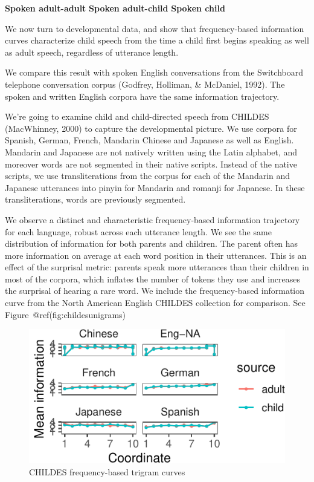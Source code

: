 \documentclass[10pt, letterpaper]{article}
\newenvironment{CodeChunk}{}{}
\begin{document}
\textbf{Spoken adult-adult} \textbf{Spoken adult-child} \textbf{Spoken
child}

We now turn to developmental data, and show that frequency-based
information curves characterize child speech from the time a child first
begins speaking as well as adult speech, regardless of utterance length.

We compare this result with spoken English conversations from the
Switchboard telephone conversation corpus (Godfrey, Holliman, \&
McDaniel, 1992). The spoken and written English corpora have the same
information trajectory.

We're going to examine child and child-directed speech from CHILDES
(MacWhinney, 2000) to capture the developmental picture. We use corpora
for Spanish, German, French, Mandarin Chinese and Japanese as well as
English. Mandarin and Japanese are not natively written using the Latin
alphabet, and moreover words are not segmented in their native scripts.
Instead of the native scripts, we use transliterations from the corpus
for each of the Mandarin and Japanese utterances into pinyin for
Mandarin and romanji for Japanese. In these transliterations, words are
previously segmented.

We observe a distinct and characteristic frequency-based information
trajectory for each language, robust across each utterance length. We
see the same distribution of information for both parents and children.
The parent often has more information on average at each word position
in their utterances. This is an effect of the surprisal metric: parents
speak more utterances than their children in most of the corpora, which
inflates the number of tokens they use and increases the surprisal of
hearing a rare word. We include the frequency-based information curve
from the North American English CHILDES collection for comparison. See
Figure~@ref(fig:childesunigrams)

\begin{CodeChunk}
\begin{figure}[tb]
\includegraphics{figs/childesunigrams-1} \caption[CHILDES frequency-based trigram curves]{CHILDES frequency-based trigram curves}\label{fig:childesunigrams}
\end{figure}
\end{CodeChunk}
\end{document}
